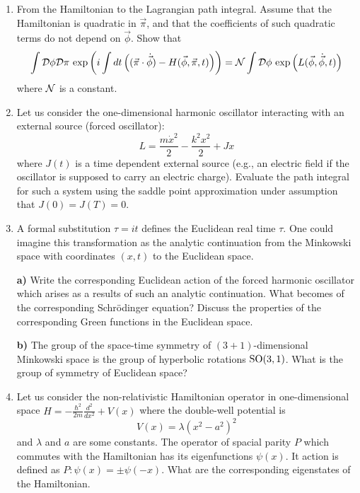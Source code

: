 \documentclass[a4paper,11pt]{article}
\begin{document}
\begin{enumerate}
\item From the Hamiltonian to the Lagrangian path integral. Assume
  that the Hamiltonian is quadratic in $\vec{ \pi }$, and that the
  coefficients of such quadratic terms do not depend on
  $\vec{ \phi }$. Show that
  \begin{equation}
    \label{eq:34}
    \int \mathcal{D} \phi \mathcal{D} \pi \, \exp\left( i \int dt \left( ( \vec{ \pi }
        \cdot \dot{ \vec{ \phi } } ) - H( \vec{ \phi }, \vec{ \pi }, t )
      \right) \right)
    =
    \mathcal{N} \int \mathcal{D} \phi \, \exp\left( L( \vec{ \phi }, \dot{ \vec{ \phi } }, t )
    \right)
  \end{equation}
  where $\mathcal{N}$ is a constant.



\item Let us consider the one-dimensional harmonic oscillator
  interacting with an external source (forced oscillator):
  \begin{equation}
    \label{eq:35}
    L =
    \frac{ m \dot{ x }^{ 2 } }{ 2 } - \frac{ k^{ 2 } x^{ 2 } }{ 2 } + J x
  \end{equation}
  where $J( t )$ is a time dependent external source (e.g., an
  electric field if the oscillator is supposed to carry an electric
  charge). Evaluate the path integral for such a system using the
  saddle point approximation under assumption that
  $J( 0 ) = J( T ) = 0$.



\item A formal substitution $\tau = it$ defines the Euclidean real time
  $\tau$. One could imagine this transformation as the analytic
  continuation from the Minkowski space with coordinates $( x, t )$ to
  the Euclidean space.

  \textbf{a)} Write the corresponding Euclidean action of the forced
  harmonic oscillator which arises as a results of such an analytic
  continuation. What becomes of the corresponding Schr\"{o}dinger
  equation? Discuss the properties of the corresponding Green
  functions in the Euclidean space.

  \textbf{b)} The group of the space-time symmetry of
  $( 3 + 1 )$-dimensional Minkowski space is the group of hyperbolic
  rotations $\mathrm{SO}( 3, 1 )$. What is the group of symmetry of Euclidean
  space?



\item Let us consider the non-relativistic Hamiltonian operator in
  one-dimensional space
  $H = -\frac{ \hbar^{ 2 } }{ 2m } \frac{ d^{ 2 } }{ dx^{ 2 } } + V( x )$
  where the double-well potential is
  \begin{equation}
    \label{eq:36}
    V( x ) = \lambda ( x^{ 2 } - a^{ 2 } )^{ 2 }
  \end{equation}
  and $\lambda$ and $a$ are some constants. The operator of spacial parity
  $P$ which commutes with the Hamiltonian has its eigenfunctions
  $\psi( x )$. It action is defined as
  $P : \psi( x ) = \pm\psi( -x )$. What are the corresponding eigenstates of
  the Hamiltonian.

\end{enumerate}
\end{document}
